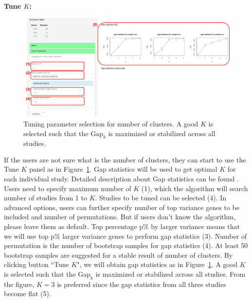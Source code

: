 \begin{steps}

\item \textbf{Tune $K$:} 

\begin{figure}[H]
\begin{center}
\includegraphics[scale=0.5]{./figure/metaClust/tuneK.pdf}
\caption{Tuning parameter selection for number of clusters.
A good $K$ is selected such that the $\mbox{Gap}_k$ is maximized or stabilized across all studies.
}
\label{fig:metaClusttuneK}
\end{center}
\end{figure}

If the users are not sure what is the number of clusters,
they can start to use the Tune $K$ panel as in Figure~\ref{fig:metaClusttuneK}.
Gap statistics will be used to get optimal $K$ for each individual study.
Detailed description about Gap statistics can be found \cite{tibshirani2001estimating}.
Users need to specify maximum number of $K$ {\color{red} (1)}, which the algorithm will search number of studies from 1 to $K$.
Studies to be tuned can be selected {\color{red} (4)}.
In advanced options, users can further specify number of top variance genes to be included and number of permutations.
But if users don't know the algorithm, please leave them as default.
Top percentage p\% by larger variance means that we will use top p\% larger variance genes to perform gap statistics {\color{red} (3)}.
Number of permutation is the number of bootstrap samples for gap statistics {\color{red} (4)}.
At least 50 bootstrap samples are suggested for a stable result of number of clusters.
By clicking button ``Tune $K$",
we will obtain gap statistics as in Figure~\ref{fig:metaClusttuneK}.
A good $K$ is selected such that the $\mbox{Gap}_k$ is maximized or stabilized across all studies.
From the figure, $K=3$ is preferred since the gap statistics from all three studies become flat {\color{red} (5)}.


\end{steps}
